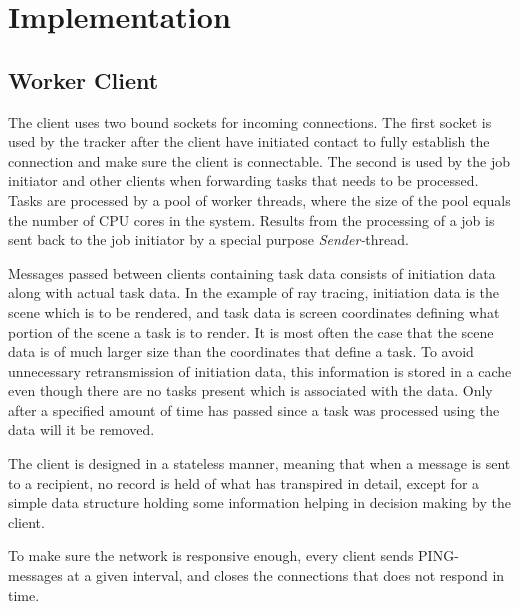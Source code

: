 \chapter{Implementation}

\section{Worker Client}
\label{sec:worker}
The client uses two bound sockets for incoming connections. The first socket is
used by the tracker after the client have initiated contact to fully establish
the connection and make sure the client is connectable. The second is used by
the job initiator and other clients when forwarding tasks that needs to be
processed. Tasks are processed by a pool of worker threads, where the size of
the pool equals the number of CPU cores in the system. Results from the
processing of a job is sent back to the job initiator by a special purpose 
\textit{Sender-}thread.

Messages passed between clients containing task data consists of initiation data
along with actual task data. In the example of ray tracing, initiation data is
the scene which is to be rendered, and task data is screen coordinates defining
what portion of the scene a task is to render. It is most often the case that
the scene data is of much larger size than the coordinates that define a task.
To avoid unnecessary retransmission of initiation data, this information is
stored in a cache even though there are no tasks present which is associated
with the data. Only after a specified amount of time has passed since a task was
processed using the data will it be removed.

The client is designed in a stateless manner, meaning that when a message is
sent to a recipient, no record is held of what has transpired in detail, except
for a simple data structure holding some information helping in decision making
by the client.

To make sure the network is responsive enough, every client sends PING-messages 
at a given interval, and closes the connections that does not respond in time.

